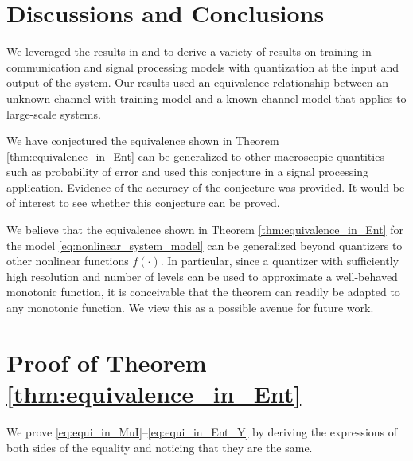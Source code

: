 \documentclass[12pt, draftclsnofoot,journal,onecolumn]{IEEEtran}
\begin{document}
\section{Discussions and Conclusions}

We leveraged the results in \cite{gaopart1} and \cite{wen2016bayes} to derive a variety of results on training in communication and signal processing models with quantization at the input and output of the system.  Our results used an equivalence relationship between an unknown-channel-with-training model and a known-channel model that applies to large-scale systems.

We have conjectured the equivalence shown in Theorem  \ref{thm:equivalence_in_Ent} can be generalized to other macroscopic quantities such as probability of error and used this conjecture in a signal processing application. Evidence of the accuracy of the conjecture was provided.  It would be of interest to see whether this conjecture can be proved.

We believe that the equivalence shown in Theorem \ref{thm:equivalence_in_Ent} for the model \eqref{eq:nonlinear_system_model} can be generalized beyond quantizers to other nonlinear functions $f(\cdot)$.  In particular, since a quantizer with sufficiently high resolution and number of levels can be used to approximate a well-behaved monotonic function, it is conceivable that the theorem can readily be adapted to any monotonic function. We view this as a possible avenue for future work. 


\appendices

\section{Proof of Theorem \ref{thm:equivalence_in_Ent}}
\label{app:proof_equivalence}


We prove \eqref{eq:equi_in_MuI}--\eqref{eq:equi_in_Ent_Y} by deriving the expressions of both sides of the equality and noticing that they are the same.
\end{document}
